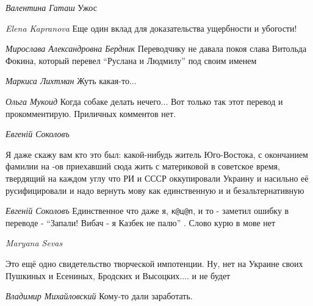 \emph{Валентина Гаташ}
Ужос

\emph{Elena Kapranova}
Еще один вклад для доказательства ущербности и убогости!

\emph{Мирослава Александровна Бердник}
Переводчику не давала покоя слава Витольда Фокина, который перевел \enquote{Руслана и Людмилу} под своим именем

\emph{Маркиса Лихтман}
Жуть какая-то...

\emph{Ольга Мукоид}
Когда собаке делать нечего... Вот только так этот перевод и прокомментирую. Приличных комментов нет.

\emph{Евгеній Соколовъ}

Я даже скажу вам кто это был: какой-нибудь житель Юго-Востока, с окончанием
фамилии на -ов приехавший сюда жить с материковой в советское время, твердящий
на каждом углу что РИ и СССР оккупировали Украину и насильно её русифицировали
и надо вернуть мову как единственную и и безальтернативную

\emph{Евгеній Соколовъ}
Единственное что даже я, \verb|к@ц@п|, и то - заметил ошибку в переводе - \enquote{Запали! Вибач - я Казбек не палю} . Слово курю в мове нет

\emph{Maryana Sevas}

Это ещё одно свидетельство творческой импотенции. Ну, нет на Украине своих
Пушкиных и Есениных, Бродских и Высоцких.... и не будет

\emph{Владимир Михайловский}
Кому-то дали заработать.


